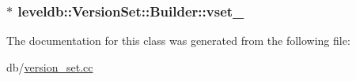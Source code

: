 \subsubsection[{vset\+\_\+}]{$\ast$ leveldb\+::\+Version\+Set\+::\+Builder\+::vset\+\_\+\hspace{0.3cm}{\ttfamily [private]}}\label{classleveldb_1_1_version_set_1_1_builder_a96967ae813b41ac070e8a9ea3df0dd7c}


The documentation for this class was generated from the following file\+:\begin{DoxyCompactItemize}
\item 
db/\hyperlink{version__set_8cc}{version\+\_\+set.\+cc}\end{DoxyCompactItemize}
